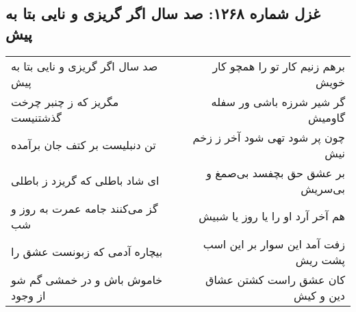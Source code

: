 \begin{center}
\section*{غزل شماره ۱۲۶۸: صد سال اگر گریزی و نایی بتا به پیش}
\label{sec:1268}
\begin{longtable}{l p{0.5cm} r}
صد سال اگر گریزی و نایی بتا به پیش
&&
برهم زنیم کار تو را همچو کار خویش
\\
مگریز که ز چنبر چرخت گذشتنیست
&&
گر شیر شرزه باشی ور سفله گاومیش
\\
تن دنبلیست بر کتف جان برآمده
&&
چون پر شود تهی شود آخر ز زخم نیش
\\
ای شاد باطلی که گریزد ز باطلی
&&
بر عشق حق بچفسد بی‌صمغ و بی‌سریش
\\
گز می‌کنند جامه عمرت به روز و شب
&&
هم آخر آرد او را یا روز یا شبیش
\\
بیچاره آدمی که زبونست عشق را
&&
زفت آمد این سوار بر این اسب پشت ریش
\\
خاموش باش و در خمشی گم شو از وجود
&&
کان عشق راست کشتن عشاق دین و کیش
\\
\end{longtable}
\end{center}
